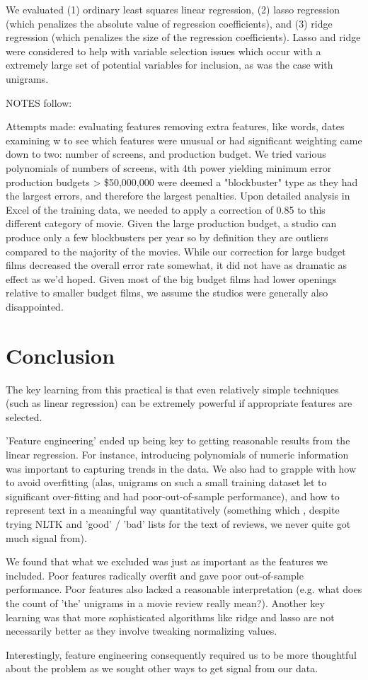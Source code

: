 \documentclass[11pt, oneside]{article}   	%
\begin{document}
We evaluated (1) ordinary least squares linear regression, (2) lasso regression (which penalizes the absolute value of regression coefficients), and (3) ridge regression (which penalizes the size of the regression coefficients). Lasso and ridge were considered to help with variable selection issues which occur with a extremely large set of potential variables for inclusion, as was the case with unigrams.


NOTES follow:

Attempts made:
evaluating features
removing extra features, like words, dates
examining w to see which features were unusual or had significant weighting
came down to two: number of screens, and production budget. We tried various polynomials of numbers of screens, with 4th power yielding minimum error
production budgets > \$50,000,000 were deemed a "blockbuster" type as they had the largest errors, and therefore the largest penalties. Upon detailed analysis in Excel of the training data, we needed to apply a correction of 0.85 to this different category of movie. Given the large production budget, a studio can produce only a few blockbusters per year so by definition they are outliers compared to the majority of the movies. While our correction for large budget films decreased the overall error rate somewhat, it did not have as dramatic as effect as we'd hoped. Given most of the big budget films had lower openings relative to smaller budget films, we assume the studios were generally also disappointed.

\section*{Conclusion}
The key learning from this practical is that even relatively simple techniques (such as linear regression) can be extremely powerful if appropriate features are selected. 

'Feature engineering' ended up being key to getting reasonable results from the linear regression. For instance, introducing polynomials of numeric information was important to capturing trends in the data. We also had to grapple with how to avoid overfitting (alas, unigrams on such a small training dataset let to significant over-fitting and had poor-out-of-sample performance), and how to represent text in a meaningful way quantitatively (something which , despite trying NLTK and 'good' / 'bad' lists for the text of reviews, we never quite got much signal from).

We found that what we excluded was just as important as the features we included. Poor features radically overfit and gave poor out-of-sample performance. Poor features also lacked a reasonable interpretation (e.g. what does the count of 'the' unigrams in a movie review really mean?). Another key learning was that more sophisticated algorithms like ridge and lasso are not necessarily better as they involve tweaking normalizing values.

Interestingly, feature engineering consequently required us to be more thoughtful about the problem as we sought other ways to get signal from our data. 
\end{document}
